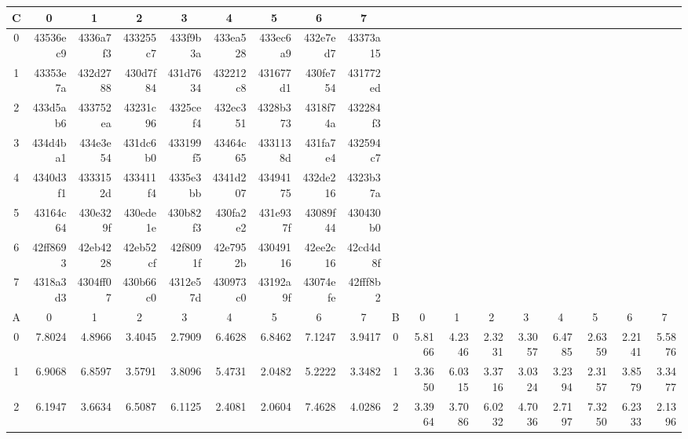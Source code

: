 \documentclass{article}
\begin{document}
\begin{adjustbox}{angle=90}
{\begin{tabular}{|c|rrrrrrrr|c|rrrrrrrr|}
C & \multicolumn{1}{c}{0} & \multicolumn{1}{c}{1} & \multicolumn{1}{c}{2} & \multicolumn{1}{c}{3} & \multicolumn{1}{c}{4} & \multicolumn{1}{c}{5} & \multicolumn{1}{c}{6} & \multicolumn{1}{c|}{7} &  & \multicolumn{1}{c}{} & \multicolumn{1}{c}{} & \multicolumn{1}{c}{} & \multicolumn{1}{c}{} & \multicolumn{1}{c}{} & \multicolumn{1}{c}{} & \multicolumn{1}{c}{} & \multicolumn{1}{c|}{} \\ \hline
0 & 43536ec9 & 4336a7f3 & 433255c7 & 433f9b3a & 433ea528 & 433ec6a9 & 432e7ed7 & 43373a15 &  &  &  &  &  &  &  &  &  \\
1 & 43353e7a & 432d2788 & 430d7f84 & 431d7634 & 432212c8 & 431677d1 & 430fe754 & 431772ed &  &  &  &  &  &  &  &  &  \\
2 & 433d5ab6 & 433752ea & 43231c96 & 4325cef4 & 432ec351 & 4328b373 & 4318f74a & 432284f3 &  &  &  &  &  &  &  &  &  \\
3 & 434d4ba1 & 434e3e54 & 431dc6b0 & 433199f5 & 43464c65 & 4331138d & 431fa7e4 & 432594c7 &  &  &  &  &  &  &  &  &  \\
4 & 4340d3f1 & 4333152d & 433411f4 & 4335e3bb & 4341d207 & 43494175 & 432de216 & 4323b37a &  &  &  &  &  &  &  &  &  \\
5 & 43164c64 & 430e329f & 430ede1e & 430b82f3 & 430fa2e2 & 431e937f & 43089f44 & 430430b0 &  &  &  &  &  &  &  &  &  \\
6 & 42ff8693 & 42eb4228 & 42eb52cf & 42f8091f & 42e7952b & 43049116 & 42ee2c16 & 42cd4d8f &  &  &  &  &  &  &  &  &  \\
7 & 4318a3d3 & 4304ff07 & 430b66c0 & 4312e57d & 430973c0 & 43192a9f & 43074efe & 42fff8b2 &  &  &  &  &  &  &  &  &  \\ \hline
A & \multicolumn{1}{c}{0} & \multicolumn{1}{c}{1} & \multicolumn{1}{c}{2} & \multicolumn{1}{c}{3} & \multicolumn{1}{c}{4} & \multicolumn{1}{c}{5} & \multicolumn{1}{c}{6} & \multicolumn{1}{c|}{7} & B & \multicolumn{1}{c}{0} & \multicolumn{1}{c}{1} & \multicolumn{1}{c}{2} & \multicolumn{1}{c}{3} & \multicolumn{1}{c}{4} & \multicolumn{1}{c}{5} & \multicolumn{1}{c}{6} & \multicolumn{1}{c|}{7} \\ \hline
0 & 7.8024 & 4.8966 & 3.4045 & 2.7909 & 6.4628 & 6.8462 & 7.1247 & 3.9417 & 0 & 5.8166 & 4.2346 & 2.3231 & 3.3057 & 6.4785 & 2.6359 & 2.2141 & 5.5876 \\
1 & 6.9068 & 6.8597 & 3.5791 & 3.8096 & 5.4731 & 2.0482 & 5.2222 & 3.3482 & 1 & 3.3650 & 6.0315 & 3.3716 & 3.0324 & 3.2394 & 2.3157 & 3.8579 & 3.3477 \\
2 & 6.1947 & 3.6634 & 6.5087 & 6.1125 & 2.4081 & 2.0604 & 7.4628 & 4.0286 & 2 & 3.3964 & 3.7086 & 6.0232 & 4.7036 & 2.7197 & 7.3250 & 6.2333 & 2.1396 \\

\end{tabular}}
\end{adjustbox}
\end{document}
